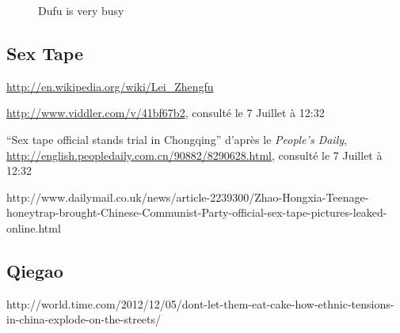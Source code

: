 \begin{figure}[h!]
    \caption{
      Dufu is very busy 
    }
\end{figure}

\clearpage
\subsection{Sex Tape }

\url{http://en.wikipedia.org/wiki/Lei_Zhengfu}

\url{http://www.viddler.com/v/41bf67b2}, consulté le 7 Juillet à 12:32

``Sex tape official stands trial in Chongqing'' d'après le \textit{People's Daily}, \url{http://english.peopledaily.com.cn/90882/8290628.html}, consulté le 7 Juillet à 12:32

http://www.dailymail.co.uk/news/article-2239300/Zhao-Hongxia-Teenage-honeytrap-brought-Chinese-Communist-Party-official-sex-tape-pictures-leaked-online.html

\clearpage
\subsection{Qiegao}

http://world.time.com/2012/12/05/dont-let-them-eat-cake-how-ethnic-tensions-in-china-explode-on-the-streets/


